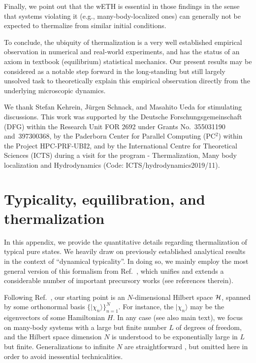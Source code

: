 \documentclass[twocolumn,aps,prb,floatfix,superscriptaddress]{revtex4-2}
\newcommand{\<}{\left\langle}	%
\renewcommand{\>}{\right\rangle}	%
\newcommand{\hr}{{\cal H}}
\begin{document}
Finally, we point out that the wETH is essential in those 
findings in the sense that systems violating it (e.g., many-body-localized ones) 
can generally not be expected to thermalize from similar initial conditions.

To conclude, the ubiquity of thermalization is a very well established 
empirical observation in numerical and real-world experiments, 
and has the status of an axiom in textbook (equilibrium) statistical 
mechanics.
Our present results may be considered as a notable step forward 
in the long-standing but still largely unsolved task to theoretically 
explain this empirical observation directly from the underlying microscopic 
dynamics.

\begin{acknowledgments}
We thank Stefan Kehrein, J\"urgen Schnack, and Masahito Ueda
for stimulating discussions.
This work was supported by the 
Deutsche Forschungsgemeinschaft (DFG)
within the Research Unit FOR 2692
under Grants No.~355031190
and~397300368,
by the Paderborn Center for Parallel 
Computing (PC$^2$) within the Project 
HPC-PRF-UBI2,
and by the International Centre for Theoretical Sciences 
(ICTS) during a visit for the program -  
Thermalization, Many body localization and Hydrodynamics 
(Code: ICTS/hydrodynamics2019/11).
\end{acknowledgments}


\appendix

\section{Typicality, equilibration, and thermalization}
\label{app:A}

In this appendix,
we provide the quantitative details
regarding thermalization of typical pure states.
%
We heavily draw
on previously established analytical results 
in the context of ``dynamical typicality''.
In doing so, we mainly employ the most 
general version of 
this formalism from Ref.~\cite{rei20}, which unifies and extends
a considerable number of important precursory works
(see references therein).

Following Ref.~\cite{rei20}, our starting point is
an $N$-dimensional Hilbert space $\hr$, spanned by some 
orthonormal basis
$\{|\chi_n\rangle\}_{n=1}^N$.
For instance, the $|\chi_n\rangle$ may 
be the eigenvectors of some Hamiltonian 
$H$.
In any case (see also main text), 
we focus on many-body systems
with a large but finite number $L$ of degrees
of freedom, and the Hilbert space 
dimension $N$ is understood to be 
exponentially large in $L$ but finite.
Generalizations to infinite $N$
are straightforward \cite{rei20},
but omitted here in order to avoid
inessential technicalities.
\end{document}
